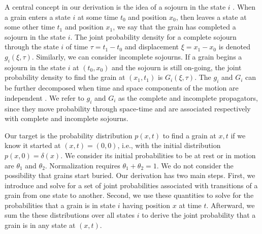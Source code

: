 \documentclass[]{agujournal2018}
\begin{document}
A central concept in our derivation is the idea of a sojourn in the state $i$ \citep{Weiss1994}.
When a grain enters a state $i$ at some time $t_0$ and position $x_0$, then leaves a state at some other time $t_1$ and position $x_1$, we say that the grain has completed a sojourn in the state $i$. The joint probability density for a complete sojourn through the state $i$ of time $\tau = t_1-t_0$ and displacement $\xi = x_1-x_0$ is denoted $g_i(\xi,\tau).$ Similarly, we can consider incomplete sojourns. If a grain begins a sojourn in the state $i$ at $(t_0,x_0)$ and the sojourn is still on-going, the joint probability density to find the grain at $(x_1,t_1)$ is $G_i(\xi,\tau)$. The $g_i$ and $G_i$ can be further decomposed when time and space components of the motion are independent \citep{Weiss1994}.
We refer to $g_i$ and $G_i$ as the complete and incomplete propagators, since they move probability through space-time and are associated respectively with complete and incomplete sojourns.

Our target is the probability distribution $p(x,t)$ to find a grain at $x,t$ if we know it started at $(x,t)=(0,0)$, i.e., with the initial distribution $p(x,0)=\delta(x)$.
We consider its initial probabilities to be at rest or in motion are $\theta_1$ and $\theta_2$. 
Normalization requires $\theta_1+\theta_2=1$.
We do not consider the possibility that grains start buried.
Our derivation has two main steps.
First, we introduce and solve for a set of joint probabilities associated with transitions of a grain from one state to another.
Second, we use these quantities to solve for the probabilities that a grain is in state $i$ having position $x$ at time $t$.
Afterward, we sum the these distributions over all states $i$ to derive the joint probability that a grain is in any state at $(x,t)$.
\end{document}
